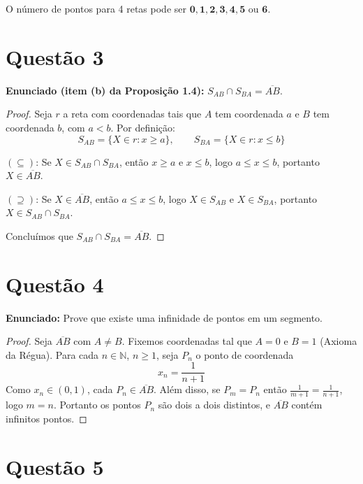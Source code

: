 \documentclass[12pt,a4paper]{article}
\begin{document}
O n\'umero de pontos para 4 retas pode ser $\mathbf{0, 1, 2, 3, 4, 5}$ ou $\mathbf{6}$.

\section*{Quest\~ao 3}

\textbf{Enunciado (item (b) da Proposi\c{c}\~ao 1.4):} $S_{AB} \cap S_{BA} = \overline{AB}$.

\begin{proof}
Seja $r$ a reta com coordenadas tais que $A$ tem coordenada $a$ e $B$ tem coordenada $b$, com $a < b$. Por defini\c{c}\~ao:
$$S_{AB} = \{X \in r : x \geq a\}, \qquad S_{BA} = \{X \in r : x \leq b\}$$

$(\subseteq)$: Se $X \in S_{AB} \cap S_{BA}$, ent\~ao $x \geq a$ e $x \leq b$, logo $a \leq x \leq b$, portanto $X \in \overline{AB}$.

$(\supseteq)$: Se $X \in \overline{AB}$, ent\~ao $a \leq x \leq b$, logo $X \in S_{AB}$ e $X \in S_{BA}$, portanto $X \in S_{AB} \cap S_{BA}$.

Conclu\'imos que $S_{AB} \cap S_{BA} = \overline{AB}$.
\end{proof}

\section*{Quest\~ao 4}

\textbf{Enunciado:} Prove que existe uma infinidade de pontos em um segmento.

\begin{proof}
Seja $\overline{AB}$ com $A \neq B$. Fixemos coordenadas tal que $A = 0$ e $B = 1$ (Axioma da R\'egua). Para cada $n \in \mathbb{N}$, $n \geq 1$, seja $P_n$ o ponto de coordenada
$$x_n = \frac{1}{n+1}$$
Como $x_n \in (0,1)$, cada $P_n \in \overline{AB}$. Al\'em disso, se $P_m = P_n$ ent\~ao $\frac{1}{m+1} = \frac{1}{n+1}$, logo $m = n$. Portanto os pontos $P_n$ s\~ao dois a dois distintos, e $\overline{AB}$ cont\'em infinitos pontos.
\end{proof}

\section*{Quest\~ao 5}
\end{document}
